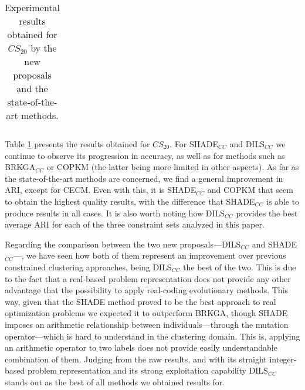 \begin{table}[!h]
{\begin{tabular}{lcccccccc}
	\end{tabular}}
	
	\caption{Experimental results obtained for $CS_{20}$ by the new proposals and the state-of-the-art methods.}
	\label{tab:resultsSOTA20}
\end{table}

Table \ref{tab:resultsSOTA20} presents the results obtained for $CS_{20}$. For \acs{SHADE}$_{CC}$ and \acs{DILS}$_{CC}$ we continue to observe its progression in accuracy, as well as for methods such as \acs{BRKGA}$_{CC}$ or \acs{COPKM} (the latter being more limited in other aspects). As far as the state-of-the-art methods are concerned, we find a general improvement in \acs{ARI}, except for CECM. Even with this, it is \acs{SHADE}$_{CC}$ and \acs{COPKM} that seem to obtain the highest quality results, with the difference that \acs{SHADE}$_{CC}$ is able to produce results in all cases. It is also worth noting how \acs{DILS}$_{CC}$ provides the best average \acs{ARI} for each of the three constraint sets analyzed in this paper.

Regarding the comparison between the two new proposals---\acs{DILS}$_{CC}$ and \acs{SHADE}$_{CC}$---, we have seen how both of them represent an improvement over previous constrained clustering approaches, being \acs{DILS}$_{CC}$ the best of the two. This is due to the fact that a real-based problem representation does not provide any other advantage that the possibility to apply real-coding evolutionary methods. This way, given that the \acs{SHADE} method proved to be the best approach to real optimization problems we expected it to outperform \acs{BRKGA}, though \acs{SHADE} imposes an arithmetic relationship between individuals---through the mutation operator---which is hard to understand in the clustering domain. This is, applying an arithmetic operator to two labels does not provide easily understandable combination of them. Judging from the raw results, and with its straight integer-based problem representation and its strong exploitation capability \acs{DILS}$_{CC}$ stands out as the best of all methods we obtained results for.





















